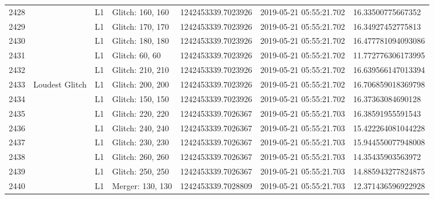 \begin{longtable}{lllllll}
2428 &                                                    &       L1 &  Glitch: 160, 160 &  1242453339.7023926 &  2019-05-21 05:55:21.702 &   16.33500775667352 \\
2429 &                                                    &       L1 &  Glitch: 170, 170 &  1242453339.7023926 &  2019-05-21 05:55:21.702 &   16.34927452775813 \\
2430 &                                                    &       L1 &  Glitch: 180, 180 &  1242453339.7023926 &  2019-05-21 05:55:21.702 &  16.477781094093086 \\
2431 &                                                    &       L1 &    Glitch: 60, 60 &  1242453339.7023926 &  2019-05-21 05:55:21.702 &  11.772776306173995 \\
2432 &                                                    &       L1 &  Glitch: 210, 210 &  1242453339.7023926 &  2019-05-21 05:55:21.702 &  16.639566147013394 \\
2433 &                                     Loudest Glitch &       L1 &  Glitch: 200, 200 &  1242453339.7023926 &  2019-05-21 05:55:21.702 &  16.706859018369798 \\
2434 &                                                    &       L1 &  Glitch: 150, 150 &  1242453339.7023926 &  2019-05-21 05:55:21.702 &   16.37363084690128 \\
2435 &                                                    &       L1 &  Glitch: 220, 220 &  1242453339.7026367 &  2019-05-21 05:55:21.703 &   16.38591955591543 \\
2436 &                                                    &       L1 &  Glitch: 240, 240 &  1242453339.7026367 &  2019-05-21 05:55:21.703 &  15.422264081044228 \\
2437 &                                                    &       L1 &  Glitch: 230, 230 &  1242453339.7026367 &  2019-05-21 05:55:21.703 &  15.944550077948008 \\
2438 &                                                    &       L1 &  Glitch: 260, 260 &  1242453339.7026367 &  2019-05-21 05:55:21.703 &   14.35435903563972 \\
2439 &                                                    &       L1 &  Glitch: 250, 250 &  1242453339.7026367 &  2019-05-21 05:55:21.703 &  14.885943277824875 \\
2440 &                                                    &       L1 &  Merger: 130, 130 &  1242453339.7028809 &  2019-05-21 05:55:21.703 &  12.371436596922928 \\

\end{longtable}
